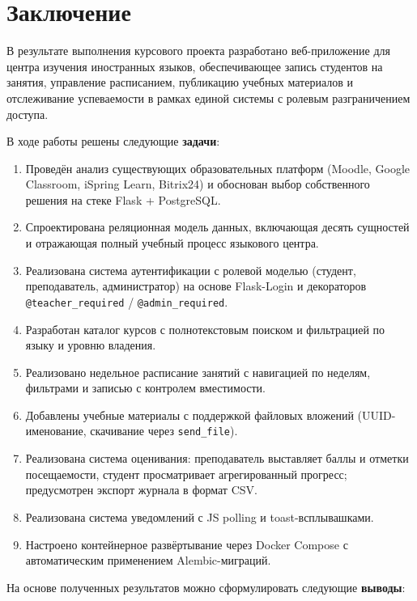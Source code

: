 \section*{Заключение}

В результате выполнения курсового проекта разработано веб-приложение для
центра изучения иностранных языков, обеспечивающее запись студентов на
занятия, управление расписанием, публикацию учебных материалов и
отслеживание успеваемости в рамках единой системы с ролевым разграничением
доступа.

В ходе работы решены следующие \textbf{задачи}:

\begin{enumerate}
    \item Проведён анализ существующих образовательных платформ (Moodle,
    Google Classroom, iSpring Learn, Bitrix24) и обоснован выбор
    собственного решения на стеке Flask + PostgreSQL.
    \item Спроектирована реляционная модель данных, включающая десять
    сущностей и отражающая полный учебный процесс языкового центра.
    \item Реализована система аутентификации с ролевой моделью (студент,
    преподаватель, администратор) на основе Flask-Login и декораторов
    \texttt{@teacher\_required} / \texttt{@admin\_required}.
    \item Разработан каталог курсов с полнотекстовым поиском и фильтрацией
    по языку и уровню владения.
    \item Реализовано недельное расписание занятий с навигацией по неделям,
    фильтрами и записью с контролем вместимости.
    \item Добавлены учебные материалы с поддержкой файловых вложений
    (UUID-именование, скачивание через \texttt{send\_file}).
    \item Реализована система оценивания: преподаватель выставляет баллы
    и отметки посещаемости, студент просматривает агрегированный прогресс;
    предусмотрен экспорт журнала в формат CSV.
    \item Реализована система уведомлений с JS polling и toast-всплывашками.
    \item Настроено контейнерное развёртывание через Docker Compose
    с автоматическим применением Alembic-миграций.
\end{enumerate}

На основе полученных результатов можно сформулировать следующие
\textbf{выводы}:

